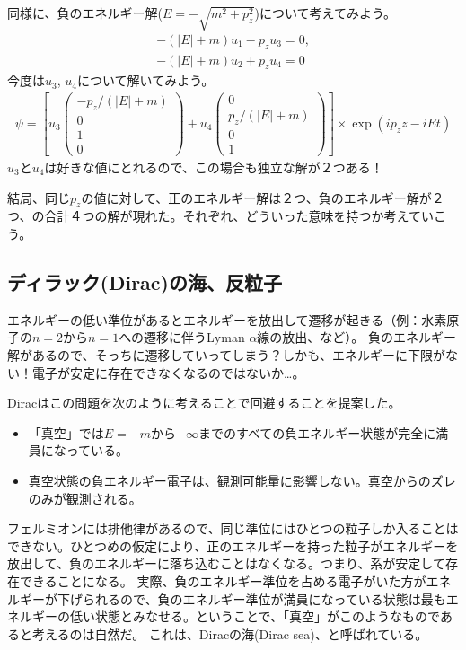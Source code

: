\documentclass[10pt,a4paper]{jarticle}
\begin{document}
同様に、負のエネルギー解($E = - \sqrt{m^2+p_z^2}$)について考えてみよう。
\begin{align}
-(|E|+m) u_1 - p_z u_3 = 0, \\
-(|E|+m) u_2 + p_z u_4 = 0
\end{align}
今度は$u_3$, $u_4$について解いてみよう。
\begin{align}
\psi =
\left[ u_3 \left(\begin{array}{cc}
-p_z/(|E|+m) \\ 0 \\ 1 \\ 0
\end{array}\right)
+
u_4 \left(\begin{array}{cc}
0 \\ p_z/(|E|+m) \\ 0 \\ 1
\end{array}\right) \right] \times \exp(ip_z z - i Et) \label{eq:negative energy solution}
\end{align}
$u_3$と$u_4$は好きな値にとれるので、この場合も独立な解が２つある！

結局、同じ$p_z$の値に対して、正のエネルギー解は２つ、負のエネルギー解が２つ、の合計４つの解が現れた。それぞれ、どういった意味を持つか考えていこう。

\subsection{ディラック(Dirac)の海、反粒子}
エネルギーの低い準位があるとエネルギーを放出して遷移が起きる（例：水素原子の$n=2$から$n=1$への遷移に伴うLyman $\alpha$線の放出、など）。
負のエネルギー解があるので、そっちに遷移していってしまう？しかも、エネルギーに下限がない！電子が安定に存在できなくなるのではないか…。

Diracはこの問題を次のように考えることで回避することを提案した。
\begin{itemize}
\item 「真空」では$E=-m$から$-\infty$までのすべての負エネルギー状態が完全に満員になっている。
\item 真空状態の負エネルギー電子は、観測可能量に影響しない。真空からのズレのみが観測される。
\end{itemize}
フェルミオンには排他律があるので、同じ準位にはひとつの粒子しか入ることはできない。ひとつめの仮定により、正のエネルギーを持った粒子がエネルギーを放出して、負のエネルギーに落ち込むことはなくなる。つまり、系が安定して存在できることになる。
実際、負のエネルギー準位を占める電子がいた方がエネルギーが下げられるので、負のエネルギー準位が満員になっている状態は最もエネルギーの低い状態とみなせる。ということで、「真空」がこのようなものであると考えるのは自然だ。
これは、Diracの海(Dirac sea)、と呼ばれている。
\end{document}
